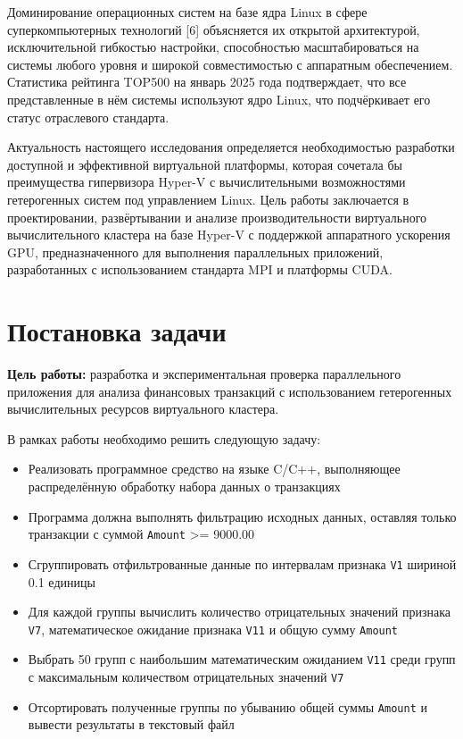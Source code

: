 \documentclass[areaset=advanced]{scrartcl}
\begin{document}
Доминирование операционных систем на базе ядра Linux в сфере суперкомпьютерных технологий [6] объясняется их открытой архитектурой, исключительной гибкостью настройки, способностью масштабироваться на системы любого уровня и широкой совместимостью с аппаратным обеспечением. Статистика рейтинга TOP500 на январь 2025 года подтверждает, что все представленные в нём системы используют ядро Linux, что подчёркивает его статус отраслевого стандарта.

Актуальность настоящего исследования определяется необходимостью разработки доступной и эффективной виртуальной платформы, которая сочетала бы преимущества гипервизора Hyper-V с вычислительными возможностями гетерогенных систем под управлением Linux. Цель работы заключается в проектировании, развёртывании и анализе производительности виртуального вычислительного кластера на базе Hyper-V с поддержкой аппаратного ускорения GPU, предназначенного для выполнения параллельных приложений, разработанных с использованием стандарта MPI и платформы CUDA.

\newpage
\section{Постановка задачи}
\textbf{Цель работы:} разработка и экспериментальная проверка параллельного приложения для анализа финансовых транзакций с использованием гетерогенных вычислительных ресурсов виртуального кластера.

В рамках работы необходимо решить следующую задачу:
\begin{itemize}
    \item Реализовать программное средство на языке C/C++, выполняющее распределённую обработку набора данных о транзакциях
    \item Программа должна выполнять фильтрацию исходных данных, оставляя только транзакции с суммой \texttt{Amount} >= 9000.00
    \item Сгруппировать отфильтрованные данные по интервалам признака \texttt{V1} шириной 0.1 единицы
    \item Для каждой группы вычислить количество отрицательных значений признака \texttt{V7}, математическое ожидание признака \texttt{V11} и общую сумму \texttt{Amount}
    \item Выбрать 50 групп с наибольшим математическим ожиданием \texttt{V11} среди групп с максимальным количеством отрицательных значений \texttt{V7}
    \item Отсортировать полученные группы по убыванию общей суммы \texttt{Amount} и вывести результаты в текстовый файл
\end{itemize}
\end{document}

